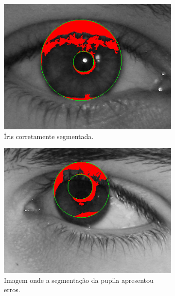 \begin{figure}[h!]
\begin{subfigure}{.25\textwidth}
\centering
\includegraphics[width=\linewidth]{img/Resultados/ubirisv2/ubirisv2_seg_boa.jpg}
\caption{Íris corretamente segmentada.}
\end{subfigure}\hfill
\begin{subfigure}{.25\textwidth}
\centering
\includegraphics[width=\linewidth]{img/Resultados/ubirisv2/ubirisv2_seg_ruim1.jpg}
\caption{Imagem onde a segmentação da pupila apresentou erros.}
\end{subfigure}\hfill
\begin{subfigure}{.25\textwidth}
\centering

\end{subfigure}
\end{figure}
